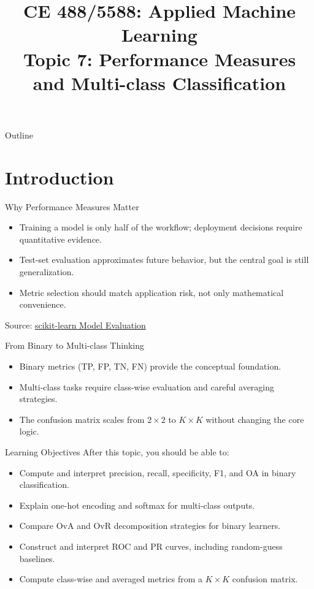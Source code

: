 \documentclass[10pt]{beamer}
\title[Topic 7]{CE 488/5588: Applied Machine Learning\\\large Topic 7: Performance Measures and Multi-class Classification}
\author{}
\date{}
\begin{document}
\begin{frame}[plain]
  \titlepage
\end{frame}

\begin{frame}{Outline}
  \justifying
  \tableofcontents
\end{frame}

\section{Introduction}

\begin{frame}{Why Performance Measures Matter}
  \justifying
  \begin{itemize}
    \item Training a model is only half of the workflow; deployment decisions require quantitative evidence.
    \item Test-set evaluation approximates future behavior, but the central goal is still generalization.
    \item Metric selection should match application risk, not only mathematical convenience.
  \end{itemize}
  \vspace{0.3em}
  {\footnotesize Source: \href{https://scikit-learn.org/stable/modules/model_evaluation.html}{scikit-learn Model Evaluation}}
\end{frame}

\begin{frame}{From Binary to Multi-class Thinking}
  \justifying
  \begin{itemize}
    \item Binary metrics (TP, FP, TN, FN) provide the conceptual foundation.
    \item Multi-class tasks require class-wise evaluation and careful averaging strategies.
    \item The confusion matrix scales from $2\times2$ to $K\times K$ without changing the core logic.
  \end{itemize}
\end{frame}

\begin{frame}{Learning Objectives}
  \justifying
  After this topic, you should be able to:
  \begin{itemize}
    \item Compute and interpret precision, recall, specificity, F1, and OA in binary classification.
    \item Explain one-hot encoding and softmax for multi-class outputs.
    \item Compare OvA and OvR decomposition strategies for binary learners.
    \item Construct and interpret ROC and PR curves, including random-guess baselines.
    \item Compute class-wise and averaged metrics from a $K\times K$ confusion matrix.
  \end{itemize}
\end{frame}
\end{document}
